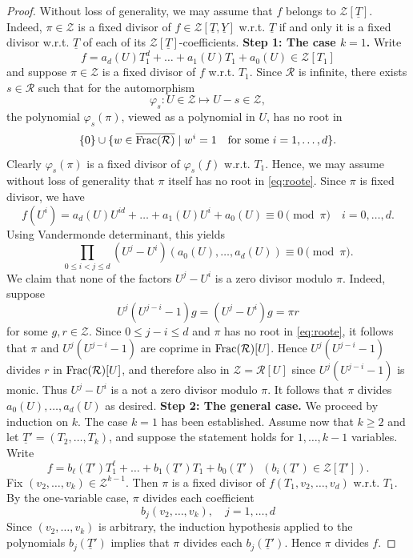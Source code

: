 \documentclass[11pt,a4paper,reqno]{amsart}
\theoremstyle{definition}
\begin{document}
\begin{proof}
Without loss of generality, we may assume that $f$ belongs to $\mathcal{Z}[\underline{T}]$. Indeed, $\pi \in \mathcal{Z}$ is a fixed divisor of $f \in \mathcal{Z}[\underline{T},\underline{Y}]$ w.r.t. $\underline{T}$ if and only it is a fixed divisor w.r.t. $\underline{T}$ of each of its $\mathcal{Z}[\underline{T}]$-coefficients. 
\vskip 1mm
\noindent
{\bf Step 1: The case $k=1$.} Write
$$
f=a_d(U)T_1^d+\dots+a_1(U)T_1+a_0(U) \in \mathcal{Z}[T_1]
$$
and suppose $\pi \in \mathcal{Z}$ is a fixed divisor of $f$ w.r.t. $T_1$. Since $\mathcal{R}$ is infinite, there exists $s \in \mathcal{R}$ such that for the automorphism 
$$\varphi_s: U \in \mathcal{Z} \mapsto U-s \in \mathcal{Z},
$$ the polynomial $\varphi_s(\pi)$, viewed as a polynomial in $U$,  has no root in 
\begin{equation}\label{eq:roote}
\{0\} \cup \{w \in \overline{{\rm Frac}(\mathcal{R})} \mid w^i=1\quad\textrm{for some }i=1,\dots,d \}.
\end{equation} Clearly $\varphi_s(\pi)$ is a fixed divisor of $\varphi_s(f)$ w.r.t. $T_1$. Hence, we may assume without loss of generality that $\pi$ itself has no root in \eqref{eq:roote}. Since $\pi$ is fixed divisor, we have
$$
f(U^i)=a_d(U)U^{id}+\dots+a_1(U)U^i+a_0(U) \equiv 0 \pmod{\pi}\quad i=0,\dots,d.
$$
Using Vandermonde determinant, this yields
$$
\prod_{0 \leq i < j\leq d}(U^j-U^i) (a_0(U),\dots,a_d(U)) \equiv 0 \pmod{\pi}.
$$
 We claim that none of the factors $U^j-U^i$ is a zero divisor modulo $\pi$. Indeed, suppose 
$$U^j(U^{j-i}-1)g=(U^j-U^i)g= \pi r
$$ for some $g,r \in \mathcal{Z}$. Since $0 \leq j-i \leq d$ and $\pi$ has no root in \eqref{eq:roote}, it follows that $\pi$ and $U^j(U^{j-i}-1)$ are coprime in ${\rm Frac}(\mathcal{R})[U]$. Hence $U^{j}(U^{j-i}-1)$ divides $r$ in ${\rm Frac}(\mathcal{R})[U]$, and therefore also in $\mathcal{Z}=\mathcal{R}[U]$ since $U^j(U^{j-i}-1)$ is monic. Thus $U^j-U^i$ is a not a zero divisor modulo $\pi$. It follows that $\pi$ divides $a_0(U),\dots,a_d(U)$ as desired.
\vskip 1mm
\noindent
{\bf Step 2: The general case.} We proceed by induction on $k$. The case $k=1$ has been established. Assume now that $k \geq 2$ and let $\underline{T}'=(T_2,\dots,T_k)$, and suppose the statement holds for $1,\dots,k-1$ variables. Write
$$
f=b_\ell(\underline{T}')T_1^\ell+ \dots+b_1(\underline{T}')T_1+b_0(\underline{T}')\,\,\, (b_i(\underline{T}') \in \mathcal{Z}[\underline{T}']).
$$
Fix $(v_2,\dots,v_{k}) \in \mathcal{Z}^{k-1}$. Then $\pi$ is a fixed divisor of $f(T_1,v_2,\dots,v_d)$ w.r.t. $T_1$. By the one-variable case, $\pi$ divides each coefficient 
$$
b_j(v_2,\dots,v_k),\quad j=1,\dots,d
$$ Since $(v_2,\dots,v_k)$ is arbitrary, the induction hypothesis applied to the polynomials $b_j(\underline{T}')$ implies that $\pi$ divides each $b_j(\underline{T}')$. Hence $\pi$ divides $f$.
\end{proof}
\end{document}
